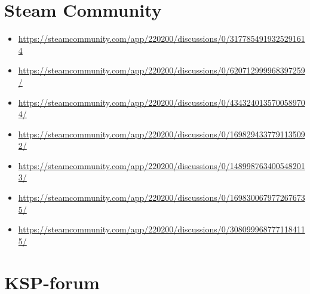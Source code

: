 \section{Steam Community}

\begin{itemize}
  \item \url{https://steamcommunity.com/app/220200/discussions/0/3177854919325291614}
  \item \url{https://steamcommunity.com/app/220200/discussions/0/620712999968397259/}
  \item \url{https://steamcommunity.com/app/220200/discussions/0/4343240135700589704/}
  \item \url{https://steamcommunity.com/app/220200/discussions/0/1698294337791135092/}
  \item \url{https://steamcommunity.com/app/220200/discussions/0/1489987634005482013/}
  \item \url{https://steamcommunity.com/app/220200/discussions/0/1698300679772676735/}
  \item \url{https://steamcommunity.com/app/220200/discussions/0/3080999687771184115/}
\end{itemize}

\section{KSP-forum}

